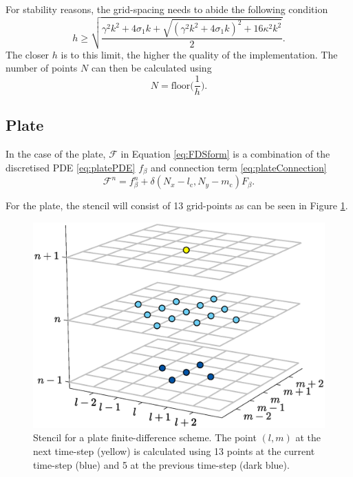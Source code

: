 \documentclass{article}
\begin{document}
For stability reasons, the grid-spacing needs to abide the following condition \cite{Bilbao2009:NumericalSoundSynthesis}
\begin{equation}\label{eq:stabilityString}
    h \geq \sqrt{\frac{\gamma^2 k^2 + 4 \sigma_1 k + \sqrt {(\gamma^2 k^2 + 4 \sigma_1 k)^2 + 16 \kappa^2 k^2}}{2}}.
\end{equation}
The closer $h$ is to this limit, the higher the quality of the implementation. The number of points $N$ can then be calculated using 
\begin{equation}
    N = \text{floor}\bigg(\frac{1}{h}\bigg).
\end{equation}

\subsection{Plate}
In the case of the plate, $\mathcal{F}$ in Equation \eqref{eq:FDSform} is a combination of the discretised PDE \eqref{eq:platePDE} $f_\beta$ and connection term \eqref{eq:plateConnection}
\begin{equation}
    \mathcal{F}^n = f_\beta^n + \delta(N_x - l_{\text{c}},N_y - m_{\text{c}})F_\beta.
\end{equation}

For the plate, the stencil will consist of 13 grid-points as can be seen in Figure \ref{fig:stencil2D}.
\begin{figure}[h]
\centering
\includegraphics[width=1.0\columnwidth]{stencil2Dedit.eps}
\caption{Stencil for a plate finite-difference scheme. The point $(l,m)$ at the next time-step (yellow) is calculated using 13 points at the current time-step (blue) and 5 at the previous time-step (dark blue). \label{fig:stencil2D}}
\end{figure}
\end{document}
